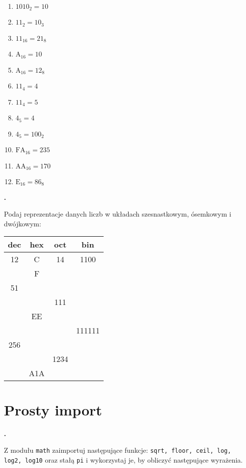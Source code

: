 \documentclass[a4paper]{article}
\begin{document}
\begin{multicols}{3}
\begin{enumerate}[label=\arabic*.]
    \item $1010_{2} = 10$
    \item $11_{2} = 10_{3}$
    \item $11_{16} = 21_{8}$
    \item $\mathrm{A_{16}} = 10$
    \item $\mathrm{A_{16}} = 12_{8}$

    \item $11_{4} = 4$
    \item $11_{4} = 5$
    \item $4_{5} = 4$
    \item $4_{5} = 100_{2}$

    \item $\mathrm{FA_{16}} = 235$
    \item $\mathrm{AA_{16}} = 170$
    \item $\mathrm{E_{16}} = 86_{8}$

\end{enumerate}
\end{multicols}

\textbf{.}\addtocounter{zadanie}{1} Podaj reprezentacje danych liczb w układach szesnastkowym, ósemkowym i dwójkowym:

\begin{tabular}{c | c | c | c}
\textsf{dec} & \textsf{hex} & \textsf{oct} & \textsf{bin}\\\hline
12  & C & 14 & 1100 \\\hline
    & F &    &  \\\hline
51  &   &    &  \\\hline
    &   & 111 & \\\hline
    & EE &  &   \\\hline
    &   &   & 111111 \\\hline
256 &   &   &   \\\hline
    &   & 1234 &    \\\hline
    & A1A &     &   \\

\end{tabular}


\section{Prosty import}

\textbf{.}\addtocounter{zadanie}{1} Z modułu \verb|math| zaimportuj następujące funkcje: \verb|sqrt, floor, ceil, log, log2, log10| oraz stałą \verb|pi| i wykorzystaj je, by obliczyć następujące wyrażenia.
\end{document}
